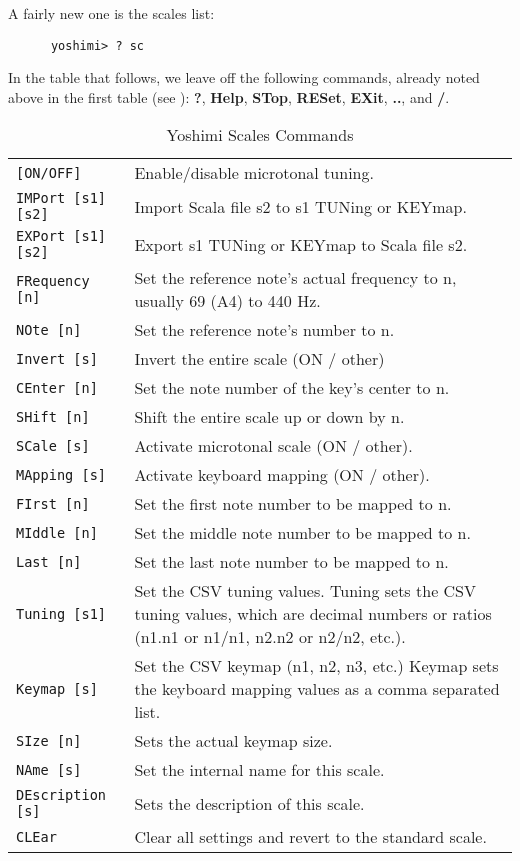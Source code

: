    A fairly new one is the scales list:

   \begin{verbatim}
      yoshimi> ? sc
   \end{verbatim}

   In the table that follows, we leave off the following commands, already noted
   above in the first table
   (see ):
   \textbf{?}, \textbf{Help}, \textbf{STop}, \textbf{RESet},
   \textbf{EXit}, \textbf{..}, and \textbf{/}.

\begin{center}
\begin{longtable}{p{4cm} p{10cm}}
\caption[Yoshimi Scales Commands]{Yoshimi Scales Commands} \\

\texttt{[ON/OFF]} & Enable/disable microtonal tuning. \\
\texttt{IMPort [s1] [s2]} &
   Import Scala file s2 to s1 TUNing or KEYmap.  \\
\texttt{EXPort [s1] [s2]} &
   Export s1 TUNing or KEYmap to Scala file s2. \\

\texttt{FRequency [n]} &
   Set the reference note's actual frequency to n, usually 69 (A4) to 440 Hz. \\
\texttt{NOte [n]} &
   Set the reference note's number to n. \\
\texttt{Invert [s]} &
   Invert the entire scale (ON / other) \\
\texttt{CEnter [n]} &
   Set the note number of the key's center to n. \\
\texttt{SHift [n]} &
   Shift the entire scale up or down by n. \\
\texttt{SCale [s]} &
   Activate microtonal scale (ON / other). \\
\texttt{MApping [s]} &
   Activate keyboard mapping (ON / other). \\
\texttt{FIrst [n]} &
   Set the first note number to be mapped to n. \\
\texttt{MIddle [n]} &
   Set the middle note number to be mapped to n. \\
\texttt{Last [n]} &
   Set the last note number to be mapped to n. \\
\texttt{Tuning [s1]} &
   Set the CSV tuning values.
   Tuning sets the CSV tuning values, which are decimal numbers or ratios
   (n1.n1 or n1/n1, n2.n2 or n2/n2, etc.).\\
\texttt{Keymap [s]} &
   Set the CSV keymap (n1, n2, n3, etc.)
   Keymap sets the keyboard mapping values as a comma separated list. \\
\texttt{SIze [n]} &
   Sets the actual keymap size. \\
\texttt{NAme [s]} &
   Set the internal name for this scale. \\
\texttt{DEscription [s]} &
   Sets the description of this scale. \\
\texttt{CLEar} &
   Clear all settings and revert to the standard scale. \\
\end{longtable}
\end{center}


